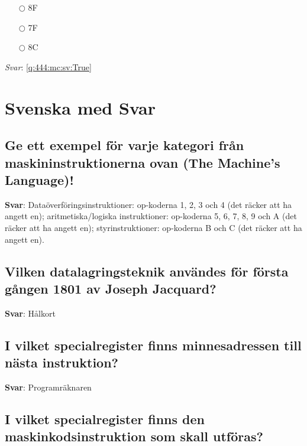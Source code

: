 \documentclass[a4paper,11pt,oneside]{book}
\begin{document}
\begin{sloppypar}
\label{q:444:mc:sv:False}

\begin{itemize}
  \item[$\bigcirc$] 8F
  \item[$\bigcirc$] 7F
  \item[$\bigcirc$] 8C
\end{itemize}

\vspace{1cm}

\textit{Svar}: \autoref{q:444:mc:sv:True}

\chapter{Svenska med Svar}
\label{svenska}

\section{Ge ett exempel f\"or varje kategori fr\r{a}n maskininstruktionerna ovan (The Machine{\textquoteright}s Language)!}

\label{q:1:sa:sv:True}

\textbf{Svar}: Data\"overf\"oringsinstruktioner: op-koderna 1, 2, 3 och 4 (det r\"acker att ha angett en); aritmetiska/logiska instruktioner: op-koderna 5, 6, 7, 8, 9 och A (det r\"acker att ha angett en); styrinstruktioner: op-koderna B och C (det r\"acker att ha angett en).



\section{Vilken datalagringsteknik anv\"andes f\"or f\"orsta g\r{a}ngen 1801 av Joseph Jacquard?}

\label{q:3:sa:sv:True}

\textbf{Svar}: H\r{a}lkort



\section{I vilket specialregister finns minnesadressen till n\"asta instruktion?}

\label{q:4:sa:sv:True}

\textbf{Svar}: Programr\"aknaren



\section{I vilket specialregister finns den maskinkodsinstruktion som skall utf\"oras?}


\end{sloppypar}
\end{document}
